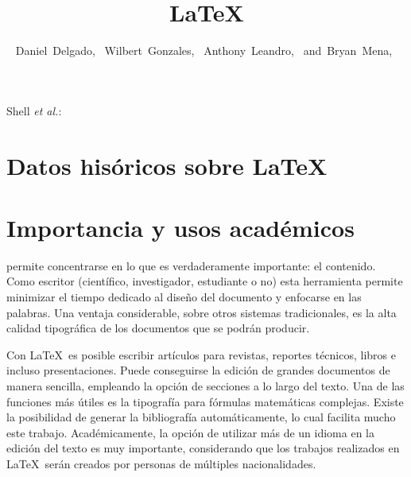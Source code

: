 \documentclass[10pt,journal,compsoc]{IEEEtran}
\begin{document}
\title{\LaTeX}

\author{Daniel~Delgado,~
        Wilbert~Gonzales,~
        Anthony~Leandro,~
        and~Bryan~Mena,~
}
{Shell \MakeLowercase{\textit{et al.}}: \LaTex}

\maketitle

\IEEEdisplaynontitleabstractindextext

\IEEEpeerreviewmaketitle

\section{Datos his\'oricos sobre LaTeX}

\section{Importancia y usos acad\'emicos}
 permite concentrarse en lo que es verdaderamente importante: el contenido. Como escritor (cient\'ifico, investigador,  estudiante o no) esta herramienta permite minimizar el tiempo dedicado al diseño del documento y enfocarse en las palabras. Una ventaja considerable, sobre otros sistemas tradicionales, es la alta calidad tipogr\'afica de los documentos que se podr\'an producir.

Con \LaTeX\ es posible escribir art\'iculos para revistas, reportes t\'ecnicos, libros e incluso presentaciones. Puede conseguirse la edici\'on de grandes documentos de manera sencilla, empleando la opci\'on de secciones a lo largo del texto. Una de las funciones m\'as \'utiles es la tipograf\'ia para f\'ormulas matem\'aticas complejas. Existe la posibilidad de generar la bibliograf\'ia autom\'aticamente, lo cual facilita mucho este trabajo. Acad\'emicamente, la opci\'on de utilizar m\'as de un idioma en la edici\'on del texto es muy importante, considerando que los trabajos realizados en \LaTeX\ ser\'an creados por personas de m\'ultiples nacionalidades.
\end{document}
